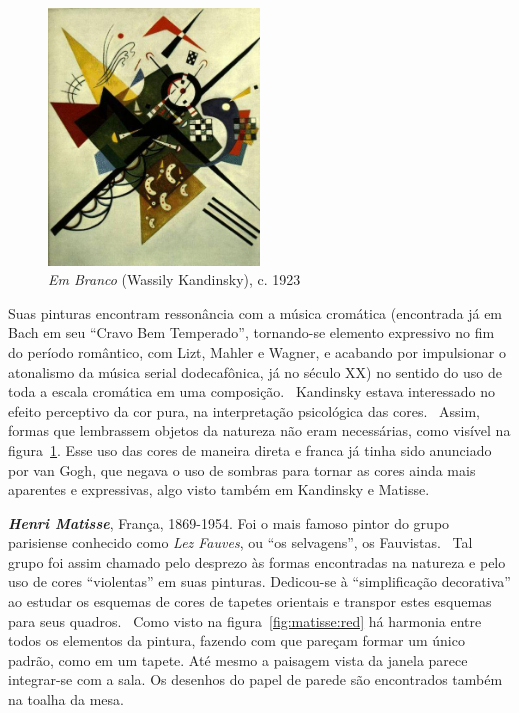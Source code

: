 \begin{figure}
  \begin{centering}
    \caption{\emph{Em Branco} (Wassily Kandinsky), c. 1923}
    \label{fig:kandinsky:white}
    \includegraphics[width=0.5\textwidth]{figs/kandinsky_white.png}
  \end{centering}
\end{figure}

Suas pinturas
encontram ressonância com a música cromática (encontrada já em Bach em
seu ``Cravo Bem Temperado'', tornando-se elemento expressivo no fim do
período romântico, com Lizt, Mahler e Wagner, e acabando por
impulsionar o atonalismo da música serial dodecafônica, já no século
XX) no sentido do uso de toda a escala cromática em uma
composição.~\cite{gombrich} Kandinsky estava interessado no efeito perceptivo da cor pura, na
interpretação psicológica das cores.~\cite{ione} Assim, formas que
lembrassem objetos da natureza não eram necessárias, como visível na
figura~\ref{fig:kandinsky:white}. Esse uso das cores de maneira direta
e franca já tinha sido anunciado por van Gogh, que negava o uso de
sombras para tornar as cores ainda mais aparentes e expressivas, algo
visto também em Kandinsky e Matisse.

\textbf{\emph{Henri Matisse}}, França, 1869-1954. Foi o mais famoso
pintor do grupo parisiense conhecido como \textit{Lez Fauves}, ou ``os
selvagens'', os Fauvistas.~\cite{elderfield,freeman} Tal grupo foi assim chamado pelo desprezo às formas encontradas na
natureza e pelo uso de cores ``violentas'' em suas
pinturas. Dedicou-se à ``simplificação decorativa'' ao estudar os
esquemas de cores de tapetes orientais e transpor estes esquemas para
seus quadros.~\cite{gombrich} Como visto na
figura~\ref{fig:matisse:red} há harmonia entre todos os elementos da
pintura, fazendo com que pareçam formar um único padrão, como em um
tapete. Até mesmo a paisagem vista da janela parece integrar-se com a
sala. Os desenhos do papel de parede são encontrados também na toalha
da mesa. 

